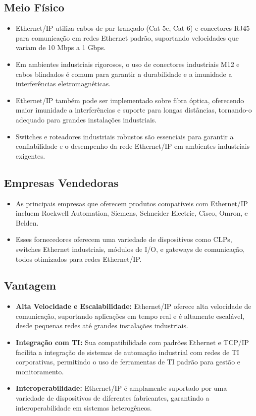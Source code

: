 \documentclass[a4paper,11pt]{article} %
\begin{document}
\subsection{Meio Físico}
\begin{itemize}
    \item Ethernet/IP utiliza cabos de par trançado (Cat 5e, Cat 6) e conectores RJ45 para comunicação em redes Ethernet padrão, suportando velocidades que variam de 10 Mbps a 1 Gbps.
    \item Em ambientes industriais rigorosos, o uso de conectores industriais M12 e cabos blindados é comum para garantir a durabilidade e a imunidade a interferências eletromagnéticas.
    \item Ethernet/IP também pode ser implementado sobre fibra óptica, oferecendo maior imunidade a interferências e suporte para longas distâncias, tornando-o adequado para grandes instalações industriais.
    \item Switches e roteadores industriais robustos são essenciais para garantir a confiabilidade e o desempenho da rede Ethernet/IP em ambientes industriais exigentes.
\end{itemize}

\subsection{Empresas Vendedoras}
\begin{itemize}
    \item As principais empresas que oferecem produtos compatíveis com Ethernet/IP incluem Rockwell Automation, Siemens, Schneider Electric, Cisco, Omron, e Belden.
    \item Esses fornecedores oferecem uma variedade de dispositivos como CLPs, switches Ethernet industriais, módulos de I/O, e gateways de comunicação, todos otimizados para redes Ethernet/IP.
\end{itemize}

\subsection{Vantagem}
\begin{itemize}
    \item \textbf{Alta Velocidade e Escalabilidade:} Ethernet/IP oferece alta velocidade de comunicação, suportando aplicações em tempo real e é altamente escalável, desde pequenas redes até grandes instalações industriais.
    \item \textbf{Integração com TI:} Sua compatibilidade com padrões Ethernet e TCP/IP facilita a integração de sistemas de automação industrial com redes de TI corporativas, permitindo o uso de ferramentas de TI padrão para gestão e monitoramento.
    \item \textbf{Interoperabilidade:} Ethernet/IP é amplamente suportado por uma variedade de dispositivos de diferentes fabricantes, garantindo a interoperabilidade em sistemas heterogêneos.
\end{itemize}
\end{document}

